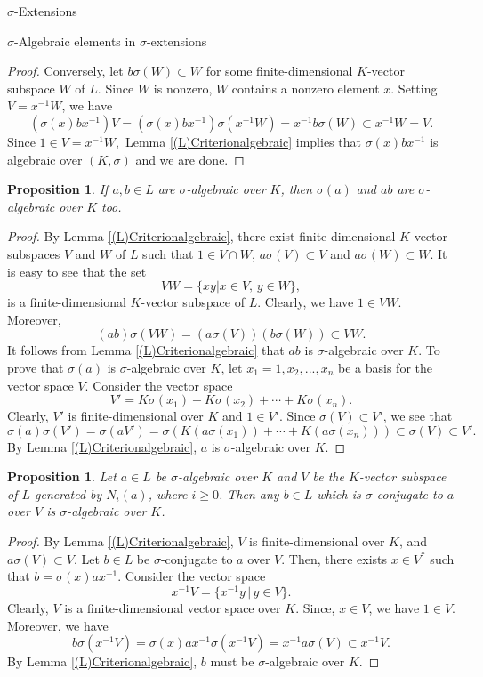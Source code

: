 \documentclass[11pt,a4paper]{article}
\theoremstyle{theorem}
\newtheorem{proposition}[theorem]{Proposition}
\numberwithin{equation}{section}
\newcommand{\s}{\sigma}
\begin{document}
\begin{section}{$\s$-Extensions}
\begin{subsection}{$\s$-Algebraic elements in $\s$-extensions }
\begin{proof}
		Conversely, let $b\s(W)\subset W$ for some finite-dimensional $K$-vector subspace $W$ of $L$.  Since $W$ is nonzero, $W$ contains a nonzero element $x$. Setting $V=x^{-1}W$, we have
		$$(\s(x)bx^{-1})V=(\s(x)bx^{-1})\s(x^{-1}W)=x^{-1}b\s(W)\subset x^{-1}W=V.$$
		Since $1\in V=x^{-1}W,$ Lemma \ref{(L)Criterionalgebraic} implies that $\s(x)bx^{-1}$ is algebraic over $(K,\s)$  and we are done. 
	\end{proof}
	\begin{proposition}
	If $a,b\in L$ are $\s$-algebraic over $K$, then $\s(a)$ and $ab$ are $\s$-algebraic over $K$ too.	
	\end{proposition}
	\begin{proof}
		 By Lemma \ref{(L)Criterionalgebraic}, there exist finite-dimensional $K$-vector subspaces $V$ and $W$ of $L$ such that $1\in V\cap W$, $a\s(V)\subset V$ and  $a\s(W)\subset W$. It is easy to see that the set
		 $$ VW=\{xy|x\in V,\, y\in W\},$$
		is a finite-dimensional $K$-vector subspace of $L$. Clearly, we have $1\in VW$. Moreover, 
		$$(ab)\s(VW)=(a\s(V))(b\s(W))\subset VW.$$
		It follows from Lemma \ref{(L)Criterionalgebraic} that  $ab$ is $\s$-algebraic over $K$. To prove that $\s(a)$ is $\s$-algebraic over $K$, let $x_1=1,x_2,...,x_n$ be a basis for the vector space $V$. Consider the vector space
		$$V'=K\s(x_1)+K\s(x_2)+\cdots+K\s(x_n).$$
		Clearly, $V'$ is finite-dimensional over $K$ and $1\in V'$. Since $\s(V)\subset V'$, we see that
		$$\s(a)\s(V')=\s(aV')=\s(K(a\s(x_1))+\cdots+K(a\s(x_n)))\subset \s(V)\subset V'.$$
		By Lemma \ref{(L)Criterionalgebraic}, $a$ is $\s$-algebraic over $K$.
	\end{proof}
	\begin{proposition}
		Let $a\in L$ be $\s$-algebraic over $K$ and $V$ be the $K$-vector subspace  of $L$ generated by $N_i(a)$, where $i\geq 0$. Then any $b\in L$ which is $\s$-conjugate to $a$ over $V$ is  $\s$-algebraic over $K$.
	\end{proposition}
	\begin{proof}
		By Lemma \ref{(L)Criterionalgebraic}, $V$ is finite-dimensional over $K$, and $a\s(V)\subset V$. Let $b\in L$ be $\s$-conjugate to $a$ over $V$. Then, there exists $x\in V^*$ such that 
		$b=\s(x)ax^{-1}$. Consider the vector space
		$$x^{-1}V=\{x^{-1}y\,|\, y\in V\}.$$
		Clearly, $V$ is a finite-dimensional  vector space over $K$. Since, $x\in V$, we have $1\in V$. Moreover, we have 
		$$b\s(x^{-1}V)=\s(x)ax^{-1}\s(x^{-1}V)=x^{-1}a\s(V)\subset x^{-1}V.$$
		By Lemma \ref{(L)Criterionalgebraic}, $b$ must be $\s$-algebraic over $K$.

\end{proof}
\end{subsection}
\end{section}
\end{document}
